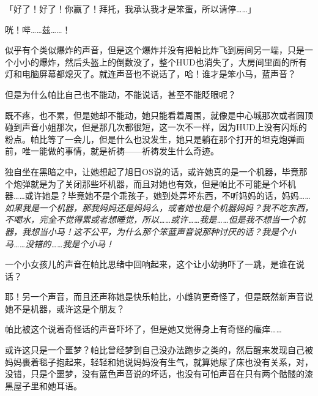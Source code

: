 「好了！好了！你赢了！拜托，我承认我才是笨蛋，所以请停……」

咣！哔……兹……！

似乎有个类似爆炸的声音，但是这个爆炸并没有把帕比炸飞到房间另一端，只是一个小小的爆炸，然后头盔上的倒数没了，整个HUD也消失了，大房间里面的所有灯和电脑屏幕都熄灭了。就连声音也不说话了，哈！谁才是笨小马，蓝声音？

但是为什么帕比自己也不能动，不能说话，甚至不能眨眼呢？

既不疼，也不累，但是她却不能动，她只能看着周围，就像是中心城那次或者圆顶碰到声音小姐那次，但是那几次都很短，这一次不一样，因为HUD上没有闪烁的粉点。帕比等了一会儿，但是什么也没发生，她只是躺在那个打开的坦克炮弹面前，唯一能做的事情，就是祈祷——祈祷发生什么奇迹。

独自坐在黑暗之中，让她想起了旭日OS说的话，或许她真的是一个机器，毕竟那个炮弹就是为了关闭那些坏机器，而且对她也有效，但是帕比不可能是个坏机器……或许她是？毕竟她不是个乖孩子，她到处弄坏东西，不听妈妈的话，妈妈……\emph{如果我是一个机器，那我妈妈还是妈妈么，或者她也是个机器妈妈？我不吃东西，不喝水，完全不觉得累或者想睡觉，所以……或许……我是……但是我不想当一个机器，我想当小马！这不公平，为什么那个笨蓝声音说那种讨厌的话？我是个小马……没错的……我是个小马！}


一个小女孩儿的声音在帕比思绪中回响起来，这个让小幼驹吓了一跳，是谁在说话？


耶！另一个声音，而且还声称她是快乐帕比，小雌驹更奇怪了，但是既然新声音说她不是机器，或许这是个朋友？


帕比被这个说着奇怪话的声音吓坏了，但是她又觉得身上有奇怪的瘙痒……{}


或许这只是一个噩梦？帕比曾经梦到自己没办法跑步之类的，然后醒来发现自己被妈妈裹着毯子抱起来，轻轻和她说妈妈没有生气，就算她尿了床也没有关系，对，没错，只是个噩梦，没有蓝色声音说的坏话，也没有可怕声音在只有两个骷髅的漆黑屋子里和她耳语。


